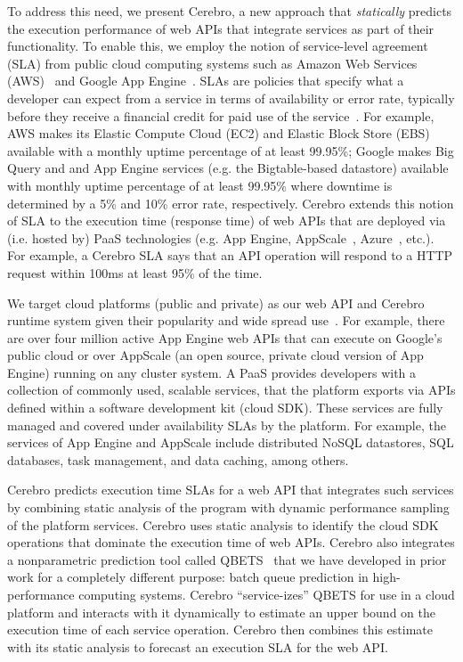 To address this need, we present Cerebro, a new approach that
\textit{statically} predicts the execution performance of web APIs that 
integrate services as part of their functionality.
To enable this, we employ the notion of service-level agreement (SLA) from 
public cloud computing systems such as Amazon Web Services (AWS)~\cite{amazon-aws-web} and 
Google App Engine~\cite{gae}.  SLAs are policies that specify
what a developer can expect from a service in terms of availability or error rate,
typically before they receive a financial credit for paid
use of the service~\cite{aws-ec2-sla,aws-s3-sla,aws-rds-sla,gae-sla,gcs-sla}.
For example, AWS makes its Elastic Compute Cloud (EC2) and Elastic Block Store (EBS) 
available with a monthly uptime percentage 
of at least 99.95\%; Google makes Big Query and and App Engine services (e.g. the 
Bigtable-based datastore) available with monthly uptime percentage of at least 
99.95\% where downtime is determined by a 5\% and 10\% error rate, respectively.
Cerebro extends this notion of SLA to the execution time (response time) 
of web APIs that are deployed via (i.e. hosted by) PaaS
technologies (e.g. App Engine, 
AppScale~\cite{6488671}, Azure~\cite{azure-web}, etc.).
For example, a Cerebro SLA says that an API operation will respond to a HTTP request
within 100ms at least 95\% of the time.

We target cloud platforms (public and private) as our web API and Cerebro 
runtime system given their popularity and wide spread use~\cite{paas-growth}.
For example, there are over four million active App Engine web APIs that 
can execute on Google's public cloud or over AppScale (an open source, private 
cloud version of App Engine) running on any cluster system.
A PaaS provides developers 
with a collection of commonly used, scalable services,
that the platform exports via APIs defined within a software 
development kit (cloud SDK).  These services are fully managed and covered under 
availability SLAs by the platform. For example, the services 
of App Engine and AppScale 
include distributed NoSQL datastores, SQL databases, task management, 
and data caching, among others. 

Cerebro predicts execution time SLAs for a web API that integrates such services 
by combining static analysis
of the program with dynamic performance sampling of the platform services.
Cerebro uses static analysis to identify the cloud SDK operations
that dominate the execution time of web APIs.  Cerebro also integrates a nonparametric
prediction tool called QBETS~\cite{Nurmi:2007:QQB:1791551.1791556} that 
we have developed in prior work for a completely different 
purpose: batch queue prediction in high-performance computing 
systems. Cerebro ``service-izes'' QBETS for use in a cloud platform and
interacts with it
dynamically to estimate an upper bound on the execution time of each service operation.
Cerebro then combines this estimate with its static analysis to forecast an execution SLA 
for the web API.


